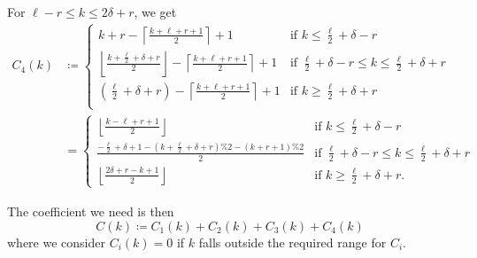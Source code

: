 \begin{itemize}
  \ii For $\ell - r \le k \le 2 \delta + r$, we get
  \begin{align*}
    C_4(k)
    &\coloneqq \begin{cases}
      k + r - \left\lceil \frac{k+\ell+r+1}{2} \right\rceil + 1 &\text{if } k \le \frac{\ell}{2} + \delta - r \\
      \left\lfloor \frac{k + \frac{\ell}{2} + \delta + r}{2} \right\rfloor - \left\lceil \frac{k+\ell+r+1}{2} \right\rceil + 1 &\text{if } \frac{\ell}{2} + \delta - r \le k \le \frac{\ell}{2} + \delta + r \\
      \left( \frac{\ell}{2} + \delta + r \right)- \left\lceil \frac{k+\ell+r+1}{2} \right\rceil + 1 &\text{if } k \ge \frac{\ell}{2} + \delta + r \\
    \end{cases} \\
    &= \begin{cases}
      \left\lfloor \frac{k-\ell+r+1}{2} \right\rfloor &\text{if } k \le \frac{\ell}{2} + \delta - r \\
      \frac{-\frac{\ell}{2} + \delta + 1 - (k+\frac{\ell}{2}+\delta+r)\%2 -(k+r+1)\%2}{2} & \text{if } \frac{\ell}{2} + \delta - r \le k \le \frac{\ell}{2} + \delta + r \\
      \left\lfloor \frac{2\delta + r - k + 1}{2} \right\rfloor &\text{if } k \ge \frac{\ell}{2} + \delta + r.
    \end{cases}
  \end{align*}
\end{itemize}
The coefficient we need is then
\[ C(k) \coloneqq C_1(k) + C_2(k) + C_3(k) + C_4(k) \]
where we consider $C_i(k) = 0$ if $k$ falls outside the required range for $C_i$.

